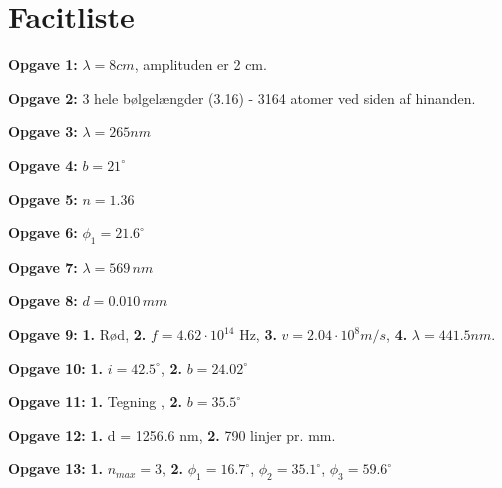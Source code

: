 \documentclass[a4paper, 12pt]{article}
\begin{document}
\section*{Facitliste}
\label{sec:orgf3ae3c3}
\textbf{Opgave 1:} \(\lambda=8cm\), amplituden er 2 cm.

\textbf{Opgave 2:} 3 hele bølgelængder (3.16) - 3164 atomer ved siden af hinanden.

\textbf{Opgave 3:} \(\lambda = 265 nm\)

\textbf{Opgave 4:} \(b=21^{\circ}\)

\textbf{Opgave 5:} \(n=1.36\)

\textbf{Opgave 6:} \(\phi_1 =21.6^{\circ}\)

\textbf{Opgave 7:} \(\lambda = 569 \,nm\)

\textbf{Opgave 8:} \(d=0.010 \,mm\) 

\textbf{Opgave 9:} \textbf{1.} Rød, \textbf{2.} \(f=4.62 \cdot 10^{14}\) Hz, \textbf{3.} \(v=2.04 \cdot 10^8 m/s\), \textbf{4.} \(\lambda = 441.5 nm\).

\textbf{Opgave 10:} \textbf{1.} \(i=42.5^{\circ}\), \textbf{2.} \(b=24.02^{\circ}\)

\textbf{Opgave 11:} \textbf{1.} Tegning , \textbf{2.} \(b=35.5^{\circ}\)

\textbf{Opgave 12:} \textbf{1.} d = 1256.6 nm, \textbf{2.} 790 linjer pr. mm.

\textbf{Opgave 13:} \textbf{1.} \(n_{max} = 3\), \textbf{2.} \(\phi_1 = 16.7^{\circ}\), \(\phi_2 = 35.1^{\circ}\), \(\phi_3 = 59.6^{\circ}\)
\end{document}
